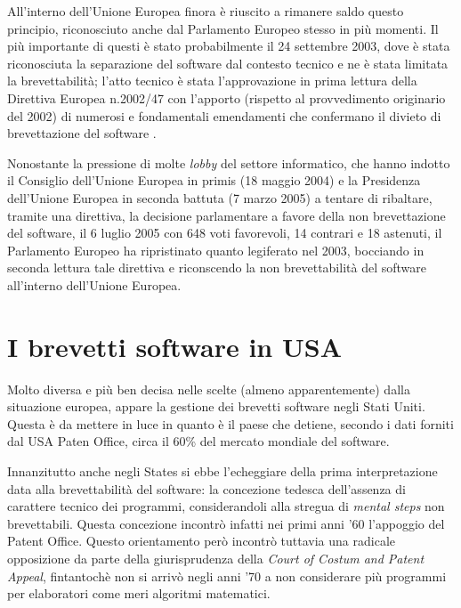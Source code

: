 All'interno dell'Unione Europea finora è riuscito a rimanere saldo questo principio, riconosciuto anche dal Parlamento Europeo stesso in più momenti. Il più importante di questi è stato probabilmente il 24 settembre 2003, dove è stata riconosciuta la separazione del software dal contesto tecnico e ne è stata limitata la brevettabilità; l'atto tecnico è stata l'approvazione in prima lettura della Direttiva Europea n.2002/47 con l'apporto (rispetto al provvedimento originario del 2002) di numerosi e fondamentali emendamenti che confermano il divieto di brevettazione del software .

Nonostante la pressione di molte \textit{lobby} del settore informatico, che hanno indotto il Consiglio dell'Unione Europea in primis (18 maggio 2004) e la Presidenza dell'Unione Europea in seconda battuta (7 marzo 2005) a tentare di ribaltare, tramite una direttiva, la decisione parlamentare a favore della non brevettazione del software, il 6 luglio 2005 con 648 voti favorevoli, 14 contrari e 18 astenuti, il Parlamento Europeo ha ripristinato quanto legiferato nel 2003, bocciando in seconda lettura tale direttiva e riconscendo la non brevettabilità del software all'interno dell'Unione Europea.

\section{I brevetti software in USA}

Molto diversa e più ben decisa nelle scelte (almeno apparentemente) dalla situazione europea, appare la gestione dei brevetti software negli Stati Uniti. Questa è da mettere in luce in quanto è il paese che detiene, secondo i dati forniti dal USA Paten Office, circa il 60\% del mercato mondiale del software.

Innanzitutto anche negli States si ebbe l'echeggiare della prima interpretazione data alla brevettabilità del software: la concezione tedesca dell'assenza di carattere tecnico dei programmi, considerandoli alla stregua di \textit{mental steps} non brevettabili. Questa concezione incontrò infatti nei primi anni '60 l'appoggio del Patent Office. Questo orientamento però incontrò tuttavia una radicale opposizione da parte della giurisprudenza della \textit{Court of Costum and Patent Appeal}, fintantochè non si arrivò negli anni '70 a non considerare più programmi per elaboratori come meri algoritmi matematici.

